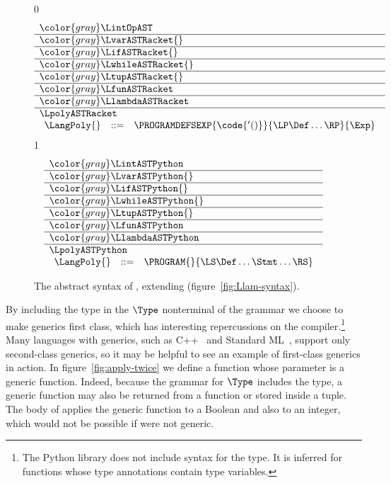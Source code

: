 \documentclass[7x10]{TimesAPriori_MIT}%
\newcommand{\gray}[1]{{\color{gray} #1}}
\def\racketEd{0}
\def\pythonEd{1}
\providecommand{\BookEdition}{1}
\let\edition\BookEdition
\newcommand{\pythonColor}[0]{}
\numberwithin{theorem}{chapter}
\numberwithin{definition}{chapter}
\numberwithin{equation}{chapter}
\begin{document}
\begin{figure}[tp]
\centering
\begin{tcolorbox}[colback=white]
\footnotesize
{\if\edition\racketEd
\[
\begin{array}{l}
  \gray{\LintOpAST} \\ \hline
  \gray{\LvarASTRacket{}} \\ \hline
  \gray{\LifASTRacket{}} \\ \hline
  \gray{\LwhileASTRacket{}} \\ \hline
  \gray{\LtupASTRacket{}} \\ \hline
  \gray{\LfunASTRacket} \\ \hline
  \gray{\LlambdaASTRacket} \\ \hline
  \LpolyASTRacket \\
\begin{array}{lcl}
  \LangPoly{} &::=& \PROGRAMDEFSEXP{\code{'()}}{\LP\Def\ldots\RP}{\Exp}
\end{array}
\end{array}
\]
\fi}
{\if\edition\pythonEd\pythonColor
\[
\begin{array}{l}
  \gray{\LintASTPython} \\ \hline
  \gray{\LvarASTPython{}} \\ \hline
  \gray{\LifASTPython{}} \\ \hline
  \gray{\LwhileASTPython{}} \\ \hline
  \gray{\LtupASTPython{}} \\ \hline
  \gray{\LfunASTPython} \\ \hline
  \gray{\LlambdaASTPython} \\ \hline
  \LpolyASTPython \\
  \begin{array}{lcl}
  \LangPoly{} &::=& \PROGRAM{}{\LS \Def \ldots \Stmt \ldots \RS}
  \end{array}
\end{array}
\]
\fi}
\end{tcolorbox}

\caption{The abstract syntax of \LangPoly{}, extending \LangLam{}
    (figure~\ref{fig:Llam-syntax}).}
\label{fig:Lpoly-syntax}
\end{figure}

By including the  type in the $\Type$ nonterminal of the
grammar we choose to make generics first class, which has interesting
repercussions on the compiler.\footnote{The Python  library does
not include syntax for the  type. It is inferred for functions whose
type annotations contain type variables.}  Many languages with generics, such as
C++~\citep{stroustrup88:_param_types} and Standard
ML~\citep{Milner:1990fk}, support only second-class generics, so it
may be helpful to see an example of first-class generics in action. In
figure~\ref{fig:apply-twice} we define a function 
whose parameter is a generic function. Indeed, because the grammar for
$\Type$ includes the  type, a generic function may also be
returned from a function or stored inside a tuple. The body of
 applies the generic function  to a Boolean
and also to an integer, which would not be possible if  were
not generic.
\end{document}
